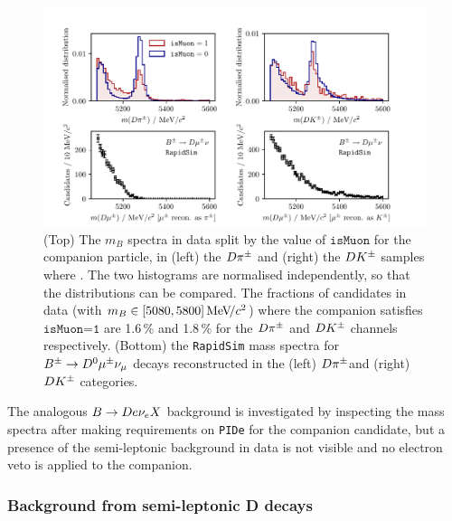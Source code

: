 \begin{figure}[tb]
    \centering
    \includegraphics[width=\columnwidth]{figures/analysis/background_checks/b2dmunu_plot.pdf}
    \caption{(Top) The $m_B$ spectra in data split by the value of $\texttt{isMuon}$ for the companion particle, in (left) the $D\pi^\pm$ and (right) the ${{D}{{K}^\pm}}$ samples where \DtoKspipi. The two histograms are normalised independently, so that the distributions can be compared. The fractions of candidates in data (with $m_B\in[5080, 5800]\text{\,Me\kern -0.1em V\!/}c^2$) where the companion satisfies $\texttt{isMuon=1}$ are 1.6\,\% and 1.8\,\% for the $D\pi^\pm$ and ${{D}{{K}^\pm}}$ channels respectively. (Bottom) the \texttt{RapidSim} mass spectra for ${{B}^\pm}\rightarrow{\ensuremath{{D}^0}}{\ensuremath{\mu^\pm}}\nu_\mu$ decays reconstructed in the (left) $D\pi^\pm $and (right) ${{D}{{K}^\pm}}$ categories.}
    \label{fig:semileptonic_B_check_mu}
\end{figure}

The analogous ${B}\rightarrow{\ensuremath{D}} e\nu_e X$ background is investigated by inspecting the \B mass spectra after making requirements on \texttt{PIDe} for the companion candidate, but a presence of the semi-leptonic background in data is not visible and no electron veto is applied to the companion.


\subsubsection{Background from semi-leptonic D decays} %
\label{ssub:background_from_semi_leptonic_d_decays}

